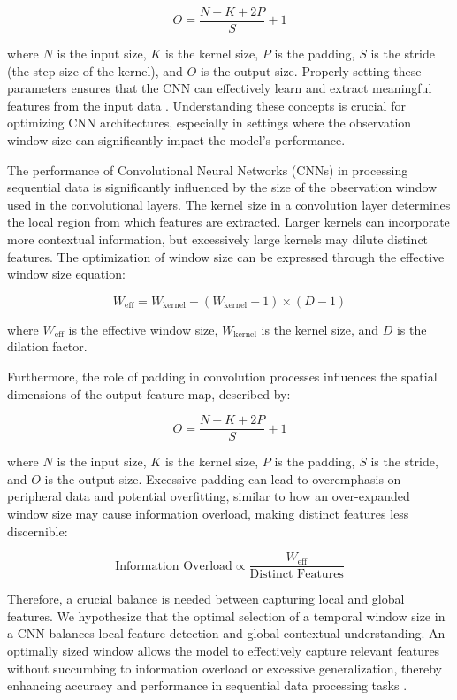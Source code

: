\[
O = \frac{N - K + 2P}{S} + 1
\]

where \(N\) is the input size, \(K\) is the kernel size, \(P\) is the padding, \(S\) is the stride (the step size of the kernel), and \(O\) is the output size. Properly setting these parameters ensures that the CNN can effectively learn and extract meaningful features from the input data \cite{chollet2017xception}. Understanding these concepts is crucial for optimizing CNN architectures, especially in settings where the observation window size can significantly impact the model's performance.

The performance of Convolutional Neural Networks (CNNs) in processing sequential data is significantly influenced by the size of the observation window used in the convolutional layers. The kernel size in a convolution layer determines the local region from which features are extracted. Larger kernels can incorporate more contextual information, but excessively large kernels may dilute distinct features. The optimization of window size can be expressed through the effective window size equation:

\[
W_{\text{eff}} = W_{\text{kernel}} + (W_{\text{kernel}} - 1) \times (D - 1)
\]

where \(W_{\text{eff}}\) is the effective window size, \(W_{\text{kernel}}\) is the kernel size, and \(D\) is the dilation factor.

Furthermore, the role of padding in convolution processes influences the spatial dimensions of the output feature map, described by:

\[
O = \frac{N - K + 2P}{S} + 1
\]

where \(N\) is the input size, \(K\) is the kernel size, \(P\) is the padding, \(S\) is the stride, and \(O\) is the output size. Excessive padding can lead to overemphasis on peripheral data and potential overfitting, similar to how an over-expanded window size may cause information overload, making distinct features less discernible:

\[
\text{Information Overload} \propto \frac{W_{\text{eff}}}{\text{Distinct Features}}
\]

Therefore, a crucial balance is needed between capturing local and global features. We hypothesize that the optimal selection of a temporal window size in a CNN balances local feature detection and global contextual understanding. An optimally sized window allows the model to effectively capture relevant features without succumbing to information overload or excessive generalization, thereby enhancing accuracy and performance in sequential data processing tasks \cite{chen2019compressing}.

